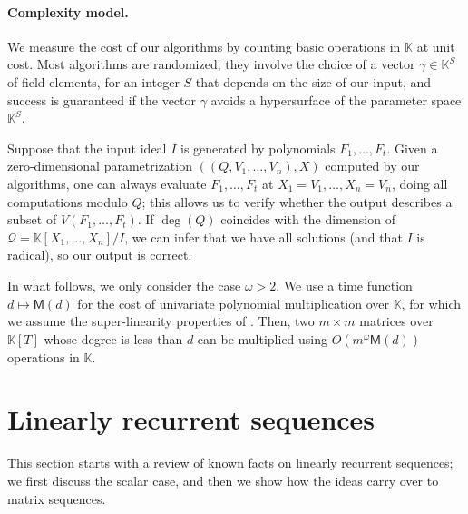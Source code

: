 \documentclass[12pt]{article}
\newcommand{\lf}{X}
\newcommand{\residueI}{\mathscr{Q}}
\newcommand{\sqfree}{Q}
\def\M {\ensuremath{\mathsf{M}}}
\def\K{\mathbb{K}}
\def\K {\ensuremath{\mathbb{K}}}
\begin{document}
\paragraph{Complexity model.}
We measure the cost of our algorithms by counting basic operations in
$\K$ at unit cost. Most algorithms are randomized; they involve the
choice of a vector $\gamma \in \K^S$ of field elements, for an integer $S$
that depends on the size of our input, and success is guaranteed if
the vector $\gamma$ avoids a hypersurface of the parameter space
$\K^S$. 

Suppose that the input ideal $I$ is generated by polynomials
$F_1,\dots,F_t$.  Given a zero-dimensional parametrization
$((\sqfree,V_1,\dots,V_n),\lf)$ computed by our algorithms, one can
always evaluate $F_1,\dots,F_t$ at $X_1 =V_1,\dots,X_n=V_n$, doing all
computations modulo $\sqfree$; this allows us to verify whether the
output describes a subset of $V(F_1,\dots,F_t)$. If $\deg(Q)$
coincides with the dimension of $\residueI=\K[X_1,\dots,X_n]/I$, we
can infer that we have all solutions (and that $I$ is radical), so our
output is correct.

In what follows, we only consider the case $\omega>2$.  We use a time
function $d \mapsto \M(d)$ for the cost of univariate polynomial
multiplication over $\K$, for which we assume the super-linearity
properties of \cite[Section~8.4]{GaGe13}.  Then, two $m\times m$
matrices over $\K[T]$ whose degree is less than $d$ can be multiplied
using $O(m^\omega \M(d))$ operations in $\K$.



\section{Linearly recurrent sequences}

This section starts with a review of known facts on linearly recurrent
sequences; we first discuss the scalar case, and then we show how the ideas
carry over to matrix sequences. 
\end{document}
